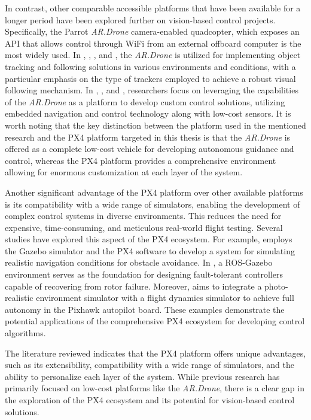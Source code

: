 In contrast, other comparable accessible platforms that have been available for a longer period have been explored further on vision-based control projects. Specifically, the Parrot \emph{AR.Drone} camera-enabled quadcopter, which exposes an API that allows control through WiFi from an external offboard computer is the most widely used.
In \cite{bartak2015}, \cite{chakrabarty2016}, \cite{pestana2013}, and \cite{haag2015}, the \emph{AR.Drone} is utilized for implementing object tracking and following solutions in various environments and conditions, with a particular emphasis on the type of trackers employed to achieve a robust visual following mechanism. 
In \cite{hernandez2013}, \cite{lugo2014}, and \cite{bristeau2011}, researchers focus on leveraging the capabilities of the \emph{AR.Drone} as a platform to develop custom control solutions, utilizing embedded navigation and control technology along with low-cost sensors. It is worth noting that the key distinction between the platform used in the mentioned research and the PX4 platform targeted in this thesis is that the \emph{AR.Drone} is offered as a complete low-cost vehicle for developing autonomous guidance and control, whereas the PX4 platform provides a comprehensive environment allowing for enormous customization at each layer of the system.

Another significant advantage of the PX4 platform over other available platforms is its compatibility with a wide range of simulators, enabling the development of complex control systems in diverse environments. This reduces the need for expensive, time-consuming, and meticulous real-world flight testing. Several studies have explored this aspect of the PX4 ecosystem. 
For example, \cite{garcia2022} employs the Gazebo simulator and the PX4 software to develop a system for simulating realistic navigation conditions for obstacle avoidance.
In \cite{chen2022}, a ROS-Gazebo environment serves as the foundation for designing fault-tolerant controllers capable of recovering from rotor failure. 
Moreover, \cite{huynh2022} aims to integrate a photo-realistic environment simulator with a flight dynamics simulator to achieve full autonomy in the Pixhawk autopilot board. 
These examples demonstrate the potential applications of the comprehensive PX4 ecosystem for developing control algorithms.


The literature reviewed indicates that the PX4 platform offers unique advantages, such as its extensibility, compatibility with a wide range of simulators, and the ability to personalize each layer of the system. While previous research has primarily focused on low-cost platforms like the \emph{AR.Drone}, there is a clear gap in the exploration of the PX4 ecosystem and its potential for vision-based control solutions.

